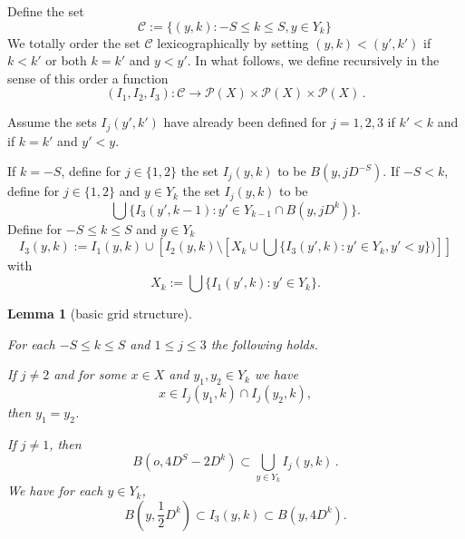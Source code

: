 \documentclass[10pt,a4paper]{article}
\theoremstyle{plain}
\newtheorem{lemma}[theorem]{Lemma}
\theoremstyle{definition}
\numberwithin{equation}{subsection}
\newcommand{\lean}[1]{}
\newcommand{\uses}[1]{}
\newcommand{\leanok}{}
\begin{document}
Define the set
\begin{equation}
    \mathcal{C}:= \{(y,k): -S\le k\le S, y\in Y_k\}\,
\end{equation}
We totally order the set $\mathcal{C}$ lexicographically by setting
$(y,k)<(y',k')$ if $k< k'$ or both $k=k'$ and $y<y'$.
In what follows, we define recursively in the sense of this order a function
\begin{equation}
    (I_1,I_2,I_3): \mathcal{C}\to \mathcal{P}(X)\times \mathcal{P}(X)\times \mathcal{P}(X)\, .
\end{equation}


Assume the sets ${I}_j(y',k')$ have already been defined for $j=1,2,3$ if $k'<k$ and if $k=k'$ and $y'<y$.




If $k=-S$, define for $j\in \{1,2\}$ the set
${I}_j(y,k)$ to be $B(y,jD^{-S})$.
If $-S<k$, define for $j\in \{1,2\}$
and $y\in Y_k$ the set ${I}_j(y,k)$ to be
\begin{equation}\label{defineij}
\bigcup\{I_3(y',k-1):
y'\in Y_{k-1}\cap B(y,jD^k)\}.
\end{equation}
Define for {$-S\leq k\leq S$} and $y\in Y_k$
\begin{equation}\label{definei3}
I_3(y,k):={I_1}(y,k)\cup \left[{I_2}(y,k)\setminus \left[X_k\cup \bigcup\{I_3(y',k):y'\in Y_{k}, y'<y\})\right]\right]
\end{equation}
with
\begin{equation}
      X_{k}:=\bigcup\{I_1(y', k):y'\in Y_{k}\}.
\end{equation}


\begin{lemma}[basic grid structure]
    \label{basic-grid-structure}
    \uses{cover-big-ball}
    \leanok
    \lean{I1_prop_1,I3_prop_1,I2_prop_2,I3_prop_2,I3_prop_3_1,I3_prop_3_2}
    For each $-S\le k\le S$ and $1\le j\le 3$
    the following holds.

    If $j\neq 2$ and for some $x\in X$ and $y_1,y_2\in Y_k$ we have
    \begin{equation}\label{disji}
        x\in I_j(y_1,k)\cap I_j(y_2,k),
    \end{equation}
    then $y_1=y_2$.

    If $j\neq 1$, then
    \begin{equation}\label{unioni}
    B(o, 4D^S-2D^k)\subset \bigcup_{y\in Y_k} I_j(y,k)\, .
    \end{equation}
    We have for each $y\in Y_k$,
    \begin{equation}\label{squeezedyadic}
        B(y,\frac 12 D^k) \subset I_3(y,k)\subset
        B(y,4D^k).
    \end{equation}
\end{lemma}
\end{document}

